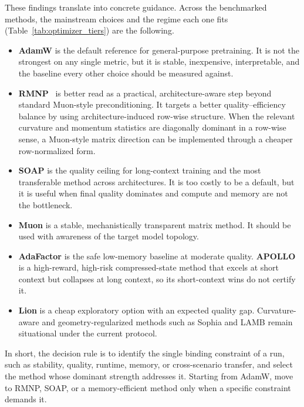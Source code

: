These findings translate into concrete guidance. Across the benchmarked
methods, the mainstream choices and the regime each one fits
(Table~\ref{tab:optimizer_tiers}) are the following.
\begin{itemize}
  \item \textbf{AdamW} is the default reference for general-purpose
  pretraining. It is not the strongest on any single metric, but it is stable,
  inexpensive, interpretable, and the baseline every other choice should be
  measured against.
  \item \textbf{RMNP}~\citep{deng2026rmnp} is better read as a
  practical, architecture-aware step beyond standard Muon-style preconditioning.
  It targets a better quality--efficiency balance by
  using architecture-induced row-wise structure. When the relevant curvature and
  momentum statistics are diagonally dominant in a row-wise sense, a Muon-style
  matrix direction can be implemented through a cheaper row-normalized form.
  \item \textbf{SOAP} is the quality ceiling for long-context training and the
  most transferable method across architectures. It is too costly to be a
  default, but it is useful when final quality dominates and compute and memory
  are not the bottleneck.
  \item \textbf{Muon} is a stable, mechanistically transparent
  matrix method. It should be used with awareness of the target model topology.
  \item \textbf{AdaFactor} is the safe low-memory baseline at moderate quality.
  \textbf{APOLLO} is a high-reward, high-risk compressed-state method that excels
  at short context but collapses at long context, so its short-context wins do
  not certify it.
  \item \textbf{Lion} is a cheap exploratory option with an expected quality gap.
  Curvature-aware and geometry-regularized methods such as Sophia and LAMB remain
  situational under the current protocol.
\end{itemize}
In short, the decision rule is to identify the single binding constraint of a
run, such as stability, quality, runtime, memory, or cross-scenario transfer,
and select the method whose dominant strength addresses it. Starting from AdamW,
move to RMNP, SOAP, or a memory-efficient method only when a specific constraint
demands it.

